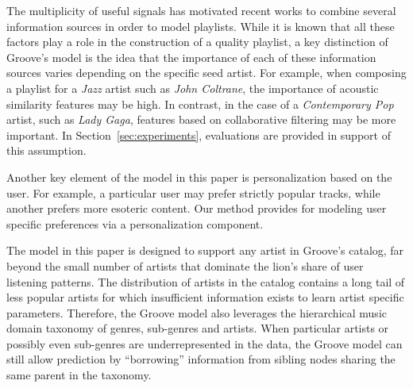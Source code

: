The multiplicity of useful signals has motivated recent works  \cite{personalized_playlist_schedl,McFee_multi_similarities} to combine several information sources in order to model playlists. %
While it is known that all these factors play a role in the construction of a quality playlist, a key distinction of Groove's model is the idea that the importance of each of these information sources varies depending on the specific seed artist. For example, when composing a playlist for a \textit{Jazz} artist such as \textit{John Coltrane}, the importance of acoustic similarity features may be high. In contrast, in the case of a \textit{Contemporary Pop} artist, such as \textit{Lady Gaga}, features based on collaborative filtering may be more important. In Section~\ref{sec:experiments}, evaluations are provided in support of this assumption.
 
Another key element of the model in this paper is personalization based on the user. For example, a particular user may prefer strictly popular tracks, while another prefers more esoteric content. %
Our method provides for modeling user specific preferences via a personalization component.



The model in this paper is designed to support any artist in Groove's catalog, far beyond the small number of artists that dominate the lion's share of user listening patterns. The distribution of artists in the catalog contains a long tail of less popular artists for which insufficient information exists to learn artist specific parameters. Therefore, the Groove model also leverages the hierarchical music domain taxonomy of genres, sub-genres and artists. %
When particular artists or possibly even sub-genres are underrepresented in the data, the Groove model can still allow prediction by ``borrowing'' information from sibling nodes sharing the same parent in the taxonomy. %

